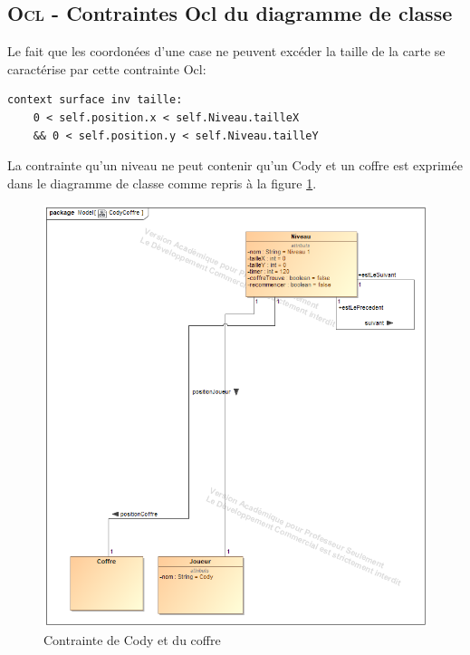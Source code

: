 
\subsection{\textsc{Ocl} - Contraintes Ocl du diagramme de classe}
\label{sec:question3}

Le fait que les coordonées d'une case ne peuvent excéder la taille de la carte se caractérise par cette contrainte Ocl:

\begin{lstlisting}[caption=Contrainte sur les coordonées d'une case,captionpos=b,label={lst:coordonées},language=OCL]
context surface inv taille:
    0 < self.position.x < self.Niveau.tailleX
    && 0 < self.position.y < self.Niveau.tailleY
\end{lstlisting}

La contrainte qu'un niveau ne peut contenir qu'un Cody et un coffre est exprimée dans le diagramme de classe comme
repris à la figure \ref{fig:CodyCoffre}.

\begin{figure}[h!]
    \centering
	\includegraphics[width=400pt]{assets/CodyCoffre}
	\caption{Contrainte de Cody et du coffre}
	\label{fig:CodyCoffre}
\end{figure}

